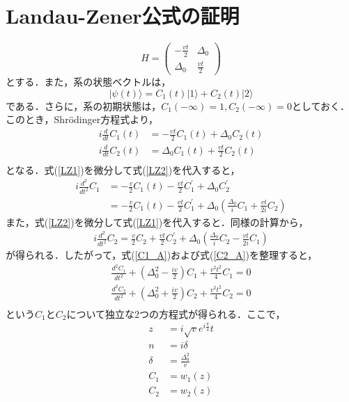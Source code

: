 \appendix
\chapter{Landau-Zener公式の証明}

\begin{equation}
  H = 
  \begin{pmatrix}
    -\frac{vt}{2} & \Delta_0\\
    \Delta_0 & \frac{vt}{2}
  \end{pmatrix}
\end{equation}
とする．また，系の状態ベクトルは，
\begin{equation}
  |\psi(t) \rangle = C_1(t) |1\rangle + C_2(t) |2\rangle
\end{equation}
である．さらに，系の初期状態は，$C_1(-\infty) = 1, C_2(-\infty) =0$としておく．このとき，Shr\"{o}dinger方程式より，
\begin{align}
  i\frac{d}{dt} C_1(t) &= -\frac{vt}{2} C_1(t) + \Delta_0 C_2(t) \label{LZ1}\\
  i\frac{d}{dt} C_2(t) &= \Delta_0 C_1(t) + \frac{vt}{2} C_2(t) \label{LZ2}\\
\end{align}
となる．式(\ref{LZ1})を微分して式(\ref{LZ2})を代入すると，
\begin{align}
  i\frac{d^2}{dt^2} C_1
  &= -\frac{v}{2} C_1(t) -\frac{vt}{2} C_1^{\prime} + \Delta_0 C_2^{\prime}\\
  &= -\frac{v}{2} C_1(t) -\frac{vt}{2} C_1^{\prime} + \Delta_0 \left( \frac{\Delta_0}{i} C_1 + \frac{vt}{2i} C_2 \right) \label{C1_A}
\end{align}
また，式(\ref{LZ2})を微分して式(\ref{LZ1})を代入すると．同様の計算から，
\begin{align}
 i\frac{d^2}{dt^2} C_2 = \frac{v}{2} C_2 + \frac{vt}{2} C_2^{\prime} + \Delta_0 \left( \frac{\Delta_0}{i} C_2 - \frac{vt}{2i} C_1 \right) \label{C2_A}
\end{align}
が得られる．したがって，式(\ref{C1_A})および式(\ref{C2_A})を整理すると，
\begin{align}
  \frac{d^2 C_1}{dt^2} + \left( \Delta_0^2 - \frac{iv}{2} \right) C_1 + \frac{v^2 t^2}{4} C_1 = 0\\
  \frac{d^2 C_2}{dt^2} + \left( \Delta_0^2 + \frac{iv}{2} \right) C_2 + \frac{v^2 t^2}{4} C_2 = 0\\
\end{align}
という$C_1$と$C_2$について独立な2つの方程式が得られる．ここで，
\begin{align}
  z &= i\sqrt{v} e^{i\frac{\pi}{4}} t \label{z_def}\\
  n &= i\delta\\
  \delta &= \frac{\Delta_0^2}{v}\\
  C_1 &= w_1(z)\\
  C_2 &= w_2(z)
\end{align}
